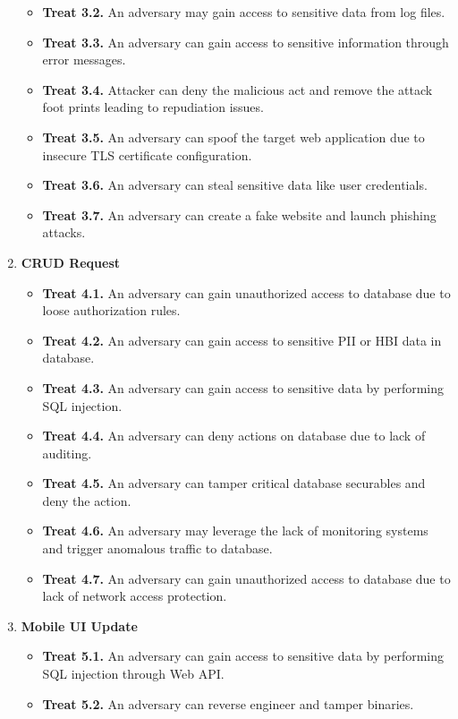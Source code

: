 \begin{enumerate}
\begin{itemize}
        \item \textbf{Treat 3.2.} An adversary may gain access to sensitive data from log files.
        \item \textbf{Treat 3.3.} An adversary can gain access to sensitive information through error messages.
        \item \textbf{Treat 3.4.} Attacker can deny the malicious act and remove the attack foot prints leading to repudiation issues.
        \item \textbf{Treat 3.5.} An adversary can spoof the target web application due to insecure TLS certificate configuration.
        \item \textbf{Treat 3.6.} An adversary can steal sensitive data like user credentials.
        \item \textbf{Treat 3.7.} An adversary can create a fake website and launch phishing attacks.
    \end{itemize}
    \item \textbf{CRUD Request}
    \begin{itemize}
        \item \textbf{Treat 4.1.} An adversary can gain unauthorized access to database due to loose authorization rules.
        \item \textbf{Treat 4.2.} An adversary can gain access to sensitive PII or HBI data in database.
        \item \textbf{Treat 4.3.} An adversary can gain access to sensitive data by performing SQL injection.
        \item \textbf{Treat 4.4.} An adversary can deny actions on database due to lack of auditing.
        \item \textbf{Treat 4.5.} An adversary can tamper critical database securables and deny the action.
        \item \textbf{Treat 4.6.} An adversary may leverage the lack of monitoring systems and trigger anomalous traffic to database.
        \item \textbf{Treat 4.7.} An adversary can gain unauthorized access to database due to lack of network access protection.
    \end{itemize}
    \item \textbf{Mobile UI Update}
    \begin{itemize}
        \item \textbf{Treat 5.1.} An adversary can gain access to sensitive data by performing SQL injection through Web API.
        \item \textbf{Treat 5.2.} An adversary can reverse engineer and tamper binaries.

\end{itemize}
\end{enumerate}
